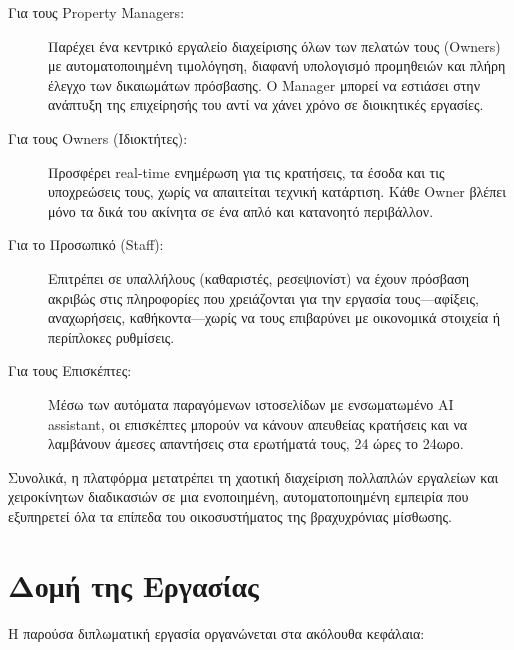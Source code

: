 \documentclass[
	12pt, %
	oneside, %
	greek,
	onehalfspacing, %
	liststotoc, %
	toctotoc, %
	parskip, %
	headsepline, %
]{MastersDoctoralThesis} %
\begin{document}
\begin{description}
    \item[Για τους Property Managers:] Παρέχει ένα κεντρικό εργαλείο διαχείρισης όλων των πελατών τους (Owners) με αυτοματοποιημένη τιμολόγηση, διαφανή υπολογισμό προμηθειών και πλήρη έλεγχο των δικαιωμάτων πρόσβασης. Ο Manager μπορεί να εστιάσει στην ανάπτυξη της επιχείρησής του αντί να χάνει χρόνο σε διοικητικές εργασίες.
    
    \item[Για τους Owners (Ιδιοκτήτες):] Προσφέρει real-time ενημέρωση για τις κρατήσεις, τα έσοδα και τις υποχρεώσεις τους, χωρίς να απαιτείται τεχνική κατάρτιση. Κάθε Owner βλέπει μόνο τα δικά του ακίνητα σε ένα απλό και κατανοητό περιβάλλον.
    
    \item[Για το Προσωπικό (Staff):] Επιτρέπει σε υπαλλήλους (καθαριστές, ρεσεψιονίστ) να έχουν πρόσβαση ακριβώς στις πληροφορίες που χρειάζονται για την εργασία τους---αφίξεις, αναχωρήσεις, καθήκοντα---χωρίς να τους επιβαρύνει με οικονομικά στοιχεία ή περίπλοκες ρυθμίσεις.
    
    \item[Για τους Επισκέπτες:] Μέσω των αυτόματα παραγόμενων ιστοσελίδων με ενσωματωμένο AI assistant, οι επισκέπτες μπορούν να κάνουν απευθείας κρατήσεις και να λαμβάνουν άμεσες απαντήσεις στα ερωτήματά τους, 24 ώρες το 24ωρο.
\end{description}

Συνολικά, η πλατφόρμα μετατρέπει τη χαοτική διαχείριση πολλαπλών εργαλείων και χειροκίνητων διαδικασιών σε μια ενοποιημένη, αυτοματοποιημένη εμπειρία που εξυπηρετεί όλα τα επίπεδα του οικοσυστήματος της βραχυχρόνιας μίσθωσης.

\section{Δομή της Εργασίας}
\label{sec:thesis-structure}

Η παρούσα διπλωματική εργασία οργανώνεται στα ακόλουθα κεφάλαια:
\end{document}
